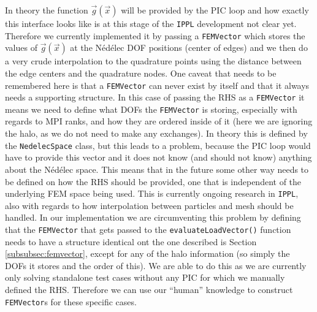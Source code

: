 In theory the function $\vec{g}(\vec{x})$ will be provided by the PIC loop and how exactly this interface looks like is at this stage of the \texttt{IPPL} development not clear yet. Therefore we currently implemented it by passing a \texttt{FEMVector} which stores the values of $\vec g(\vec x)$ at the Nédélec DOF positions (center of edges) and we then do a very crude interpolation to the quadrature points using the distance between the edge centers and the quadrature nodes. One caveat that needs to be remembered here is that a \texttt{FEMVector} can never exist by itself and that it always needs a supporting structure. In this case of passing the RHS as a \texttt{FEMVector} it means we need to define what DOFs the \texttt{FEMVector} is storing, especially with regards to MPI ranks, and how they are ordered inside of it (here we are ignoring the halo, as we do not need to make any exchanges). In theory this is defined by the \texttt{NedelecSpace} class, but this leads to a problem, because the PIC loop would have to provide this vector and it does not know (and should not know) anything about the Nédélec space. This means that in the future some other way needs to be defined on how the RHS should be provided, one that is independent of the underlying FEM space being used. This is currently ongoing research in \texttt{IPPL}, also with regards to how interpolation between particles and mesh should be handled. In our implementation we are circumventing this problem by defining that the \texttt{FEMVector} that gets passed to the \texttt{evaluateLoadVector()} function needs to have a structure identical ont the one described is Section \ref{subsubsec:femvector}, except for any of the halo information (so simply the DOFs it stores and the order of this). We are able to do this as we are currently only solving standalone test cases without any PIC for which we manually defined the RHS. Therefore we can use our ``human'' knowledge to construct \texttt{FEMVector}s for these specific cases.


